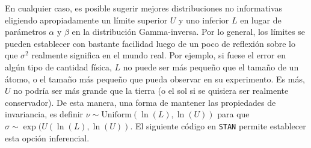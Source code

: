 \documentclass[
  10pt,
  spanish,
]{book}
\newenvironment{Shaded}{\begin{snugshade}}{\end{snugshade}}
\newcommand{\AttributeTok}[1]{\textcolor[rgb]{0.77,0.63,0.00}{#1}}
\newcommand{\ConstantTok}[1]{\textcolor[rgb]{0.00,0.00,0.00}{#1}}
\newcommand{\FunctionTok}[1]{\textcolor[rgb]{0.00,0.00,0.00}{#1}}
\newcommand{\NormalTok}[1]{#1}
\newcommand{\OtherTok}[1]{\textcolor[rgb]{0.56,0.35,0.01}{#1}}
\newcommand{\SpecialCharTok}[1]{\textcolor[rgb]{0.00,0.00,0.00}{#1}}
\newcommand{\StringTok}[1]{\textcolor[rgb]{0.31,0.60,0.02}{#1}}
\theoremstyle{definition}
\theoremstyle{definition}
\theoremstyle{definition}
\theoremstyle{definition}
\theoremstyle{remark}
\begin{document}
En cualquier caso, es posible sugerir mejores distribuciones no informativas eligiendo apropiadamente un límite superior \(U\) y uno inferior \(L\) en lugar de parámetros \(\alpha\) y \(\beta\) en la distribución Gamma-inversa. Por lo general, los límites se pueden establecer con bastante facilidad luego de un poco de reflexión sobre lo que \(\sigma^2\) realmente significa en el mundo real. Por ejemplo, si fuese el error en algún tipo de cantidad física, \(L\) no puede ser más pequeño que el tamaño de un átomo, o el tamaño más pequeño que pueda observar en su experimento. Es más, \(U\) no podría ser más grande que la tierra (o el sol si se quisiera ser realmente conservador). De esta manera, una forma de mantener las propiedades de invariancia, es definir \(\nu \sim \mathrm{Uniform}(\ln(L),\ln(U))\) para que \(\sigma\sim \exp(U(\ln(L),\ln(U))\). El siguiente código en \texttt{STAN} permite establecer esta opción inferencial.

\begin{Shaded}
\end{Shaded}
\end{document}
